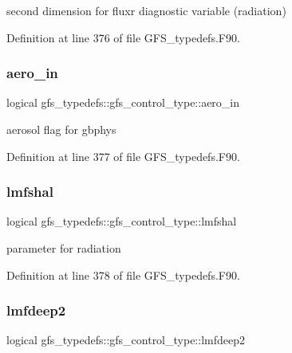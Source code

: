 second dimension for fluxr diagnostic variable (radiation) 



Definition at line 376 of file G\+F\+S\+\_\+typedefs.\+F90.

\mbox{\label{structgfs__typedefs_1_1gfs__control__type_a5f57863fddf34bc56f6a6d93f7dbef2b}} 
\subsubsection{aero\+\_\+in}
{\footnotesize\ttfamily logical gfs\+\_\+typedefs\+::gfs\+\_\+control\+\_\+type\+::aero\+\_\+in}



aerosol flag for gbphys 



Definition at line 377 of file G\+F\+S\+\_\+typedefs.\+F90.

\mbox{\label{structgfs__typedefs_1_1gfs__control__type_ac209998c9dc0a52ab7ee35855e2d715f}} 
\subsubsection{lmfshal}
{\footnotesize\ttfamily logical gfs\+\_\+typedefs\+::gfs\+\_\+control\+\_\+type\+::lmfshal}



parameter for radiation 



Definition at line 378 of file G\+F\+S\+\_\+typedefs.\+F90.

\mbox{\label{structgfs__typedefs_1_1gfs__control__type_a35beee4c26d4262b30163b4e6edc7922}} 
\subsubsection{lmfdeep2}
{\footnotesize\ttfamily logical gfs\+\_\+typedefs\+::gfs\+\_\+control\+\_\+type\+::lmfdeep2}



